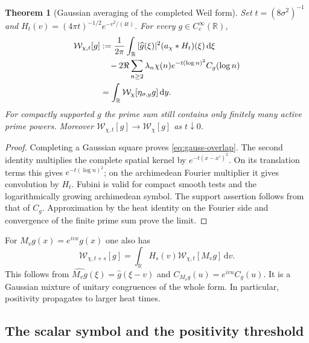 \documentclass[11pt]{article}
\newtheorem{theorem}{Theorem}[section]
\theoremstyle{definition}
\theoremstyle{remark}
\newcommand{\R}{\mathbb R}
\newcommand{\dd}{\mathrm d}
\begin{document}
\begin{theorem}[Gaussian averaging of the completed Weil form]
\label{thm:gauss-complete-average}
Set $t=(8\sigma^2)^{-1}$ and
$H_t(v)=(4\pi t)^{-1/2}e^{-v^2/(4t)}$.
For every $g\in C_c^\infty(\R)$,
\begin{equation}
 \begin{split}
 \mathcal W_{\chi,t}[g]
 &:={1\over2\pi}\int_\R|\widehat g(\xi)|^2
                         (a_\chi*H_t)(\xi)\,\dd\xi\\
 &\quad-2\Re\sum_{n\ge2}\lambda_n\chi(n)
                 e^{-t(\log n)^2}C_g(\log n)\\
 &=\int_\R\mathcal W_\chi[\eta_{\sigma,y}g]\,\dd y.
 \end{split}
 \label{eq:gauss-complete-average}
\end{equation}
For compactly supported $g$ the prime sum still contains only finitely
many active prime powers.  Moreover
$\mathcal W_{\chi,t}[g]\to\mathcal W_\chi[g]$ as $t\downarrow0$.
\end{theorem}

\begin{proof}
Completing a Gaussian square proves \eqref{eq:gauss-overlap}.
The second identity multiplies the complete spatial kernel by
$e^{-t(x-x')^2}$.  On its translation terms this gives
$e^{-t(\log n)^2}$; on the archimedean Fourier multiplier it gives
convolution by $H_t$.  Fubini is valid for compact smooth tests and the
logarithmically growing archimedean symbol.  The support assertion
follows from that of $C_g$.  Approximation by the heat identity on the
Fourier side and convergence of the finite prime sum prove the limit.
\end{proof}

For $M_vg(x)=e^{ivx}g(x)$ one also has
\begin{equation}
 \mathcal W_{\chi,t+s}[g]
 =\int_\R H_s(v)\mathcal W_{\chi,t}[M_vg]\,\dd v.
 \label{eq:gauss-dephasing}
\end{equation}
This follows from
$\widehat{M_vg}(\xi)=\widehat g(\xi-v)$ and
$C_{M_vg}(u)=e^{ivu}C_g(u)$.
It is a Gaussian mixture of unitary congruences of the whole form.
In particular, positivity propagates to larger heat times.

\subsection{The scalar symbol and the positivity threshold}
\end{document}
